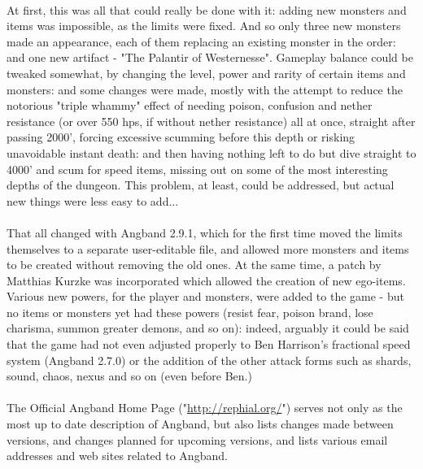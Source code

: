 \paragraph{}At first, this was all that could really be done with it: adding new 
monsters and items was impossible, as the limits were fixed. And so only 
three new monsters made an appearance, each of them replacing an existing 
monster in the order: and one new artifact - "The Palantir of Westernesse". 
Gameplay balance could be tweaked somewhat, by changing the level, power and 
rarity of certain items and monsters: and some changes were made, mostly 
with the attempt to reduce the notorious "triple whammy" effect of needing 
poison, confusion and nether resistance (or over 550 hps, if without nether 
resistance) all at once, straight after passing 2000', forcing excessive 
scumming before this depth or risking unavoidable instant death: and then
having nothing left to do but dive straight to 4000' and scum for speed
items, missing out on some of the most interesting depths of the dungeon.
This problem, at least, could be addressed, but actual new things were less
easy to add...

\paragraph{}That all changed with Angband 2.9.1, which for the first time moved the 
limits themselves to a separate user-editable file, and allowed more 
monsters and items to be created without removing the old ones. At the 
same time, a patch by Matthias Kurzke was incorporated which allowed the 
creation of new ego-items.  Various new powers, for the player and 
monsters, were added to the game - but no items or monsters yet had these 
powers (resist fear, poison brand, lose charisma, summon greater demons,
and so on): indeed, arguably it could be said that the game had not even
adjusted properly to Ben Harrison's fractional speed system (Angband 2.7.0)
or the addition of the other attack forms such as shards, sound, chaos, 
nexus and so on (even before Ben.) 


\paragraph{}The Official Angband Home Page ("\url{http://rephial.org/}")
serves not only as the most up to date description of Angband, but also
lists changes made between versions, and changes planned for upcoming
versions, and lists various email addresses and web sites related to
Angband.

